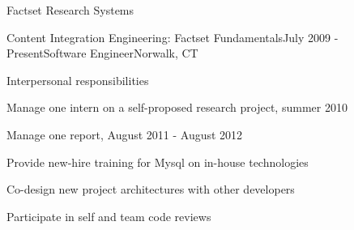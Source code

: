 \documentclass{resume} %
\begin{document}
\begin{rSection}{Factset Research Systems}
\begin{rSubsection}{Content Integration Engineering: Factset Fundamentals}{July 2009 - Present}{Software Engineer}{Norwalk, CT}
\setlength{\itemindent}{1em}
\item Interpersonal responsibilities 
\setlength{\itemindent}{2em}
\item Manage one intern on a self-proposed research project, summer 2010
\item Manage one report, August 2011 - August 2012
\item Provide new-hire training for Mysql on in-house technologies
\item Co-design new project architectures with other developers
\item Participate in self and team code reviews 


\end{rSubsection}
\end{rSection}
\end{document}
